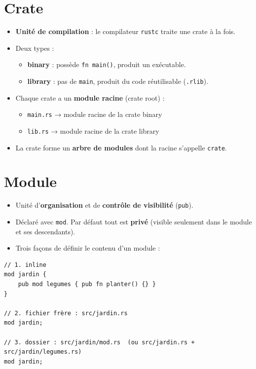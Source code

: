 \documentclass[11pt]{article}
\begin{document}
\section{Crate}
\label{sec:orgd0134a2}

\begin{itemize}
\item \textbf{Unité de compilation} : le compilateur \texttt{rustc} traite une crate à la fois.
\item Deux types :
\begin{itemize}
\item \textbf{binary} : possède \texttt{fn main()}, produit un exécutable.
\item \textbf{library} : pas de \texttt{main}, produit du code réutilisable (\texttt{.rlib}).
\end{itemize}
\item Chaque crate a un \textbf{module racine} (crate root) :
\begin{itemize}
\item \texttt{main.rs} → module racine de la crate binary
\item \texttt{lib.rs}  → module racine de la crate library
\end{itemize}
\item La crate forme un \textbf{arbre de modules} dont la racine s'appelle \texttt{crate}.
\end{itemize}
\section{Module}
\label{sec:org2016793}

\begin{itemize}
\item Unité d'\textbf{organisation} et de \textbf{contrôle de visibilité} (\texttt{pub}).
\item Déclaré avec \texttt{mod}. Par défaut tout est \textbf{privé} (visible seulement dans le module et ses descendants).
\item Trois façons de définir le contenu d'un module :
\end{itemize}

\begin{verbatim}
// 1. inline
mod jardin {
    pub mod legumes { pub fn planter() {} }
}

// 2. fichier frère : src/jardin.rs
mod jardin;

// 3. dossier : src/jardin/mod.rs  (ou src/jardin.rs + src/jardin/legumes.rs)
mod jardin;
\end{verbatim}
\end{document}
